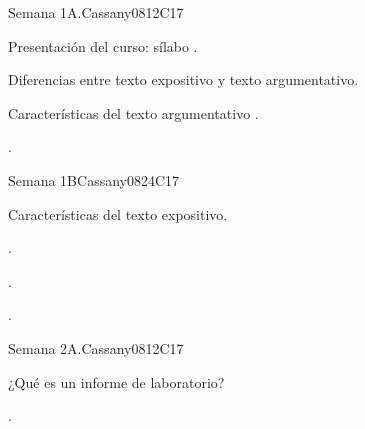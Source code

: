 \begin{syllabus}
\begin{outcomes}
   \item {}
   \item {}
\end{outcomes}

\begin{competences}
    \item {}
    \item {}
    \item {}
\end{competences}

\begin{unit}{Semana 1A.}{}{Cassany08}{12}{C17}
   \begin{topics}
      \item Presentación del curso: sílabo .
      \item Diferencias entre texto expositivo y texto argumentativo. 
      \item Características del texto argumentativo .
   \end{topics}
   \begin{learningoutcomes}
      \item . 
   \end{learningoutcomes}
\end{unit}

\begin{unit}{Semana 1B}{}{Cassany08}{24}{C17}
   \begin{topics}
      \item Características del texto expositivo.
   \end{topics}

   \begin{learningoutcomes}
      \item . 
      \item .
      \item . 
      \end{learningoutcomes}
\end{unit}

\begin{unit}{Semana 2A.}{}{Cassany08}{12}{C17}
   \begin{topics}
      \item ¿Qué es un informe de laboratorio? 
   \end{topics}
   \begin{learningoutcomes}
      \item . 
   \end{learningoutcomes}
\end{unit}


\end{syllabus}
